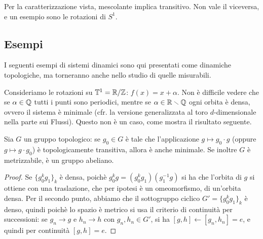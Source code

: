 \begin{oss} Per la caratterizzazione vista, mescolante implica transitivo. Non vale il viceversa, e un esempio sono le rotazioni di $S^1$. 
 
\end{oss}



\subsection{Esempi}

I seguenti esempi di sistemi dinamici sono qui presentati come dinamiche topologiche, ma torneranno anche nello studio di quelle misurabili.

\begin{esempio} Consideriamo le rotazioni su $\mathbb{T}^1=\mathbb{R}/\mathbb{Z}$: $f(x)=x+\alpha$. 
Non è difficile vedere che se $\alpha\in\mathbb{Q}$ tutti i punti sono periodici, mentre se $\alpha\in\mathbb{R}\smallsetminus\mathbb{Q}$ ogni orbita è densa, ovvero il sistema è minimale 
(cfr. la versione generalizzata al toro $d$-dimensionale nella parte sui Flussi). 
Questo non è un caso, come mostra il risultato seguente. \end{esempio}
\begin{lemma}[facoltativo] Sia $G$ un gruppo topologico: se $g_0\in G$ è tale che l'applicazione $g\mapsto g_0\cdot g$ (oppure $g\mapsto g\cdot g_0$) è topologicamente transitiva, 
allora è anche minimale. Se inoltre $G$ è metrizzabile, è un gruppo abeliano. 
\end{lemma}
\begin{proof}
 Se $\{g_0^kg_1\}_k$ è densa, poichè $g_0^kg=(g_0^kg_1)(g_1^{-1}g)$ si ha che l'orbita di $g$ si ottiene con una traslazione, che per ipotesi è un omeomorfismo, di un'orbita densa. 
 Per il secondo punto, abbiamo che il sottogruppo ciclico $G'=\{g_0^kg_1\}_k$ è denso, quindi poichè lo spazio è metrico si usa il criterio di continuità per successioni: 
 se $g_n\rightarrow g$ e $h_n\rightarrow h$ con $g_n, h_n \in G'$, si ha $[g,h]\leftarrow [g_n,h_n]=e$, e quindi per continuità $[g,h]=e$.
\end{proof}





